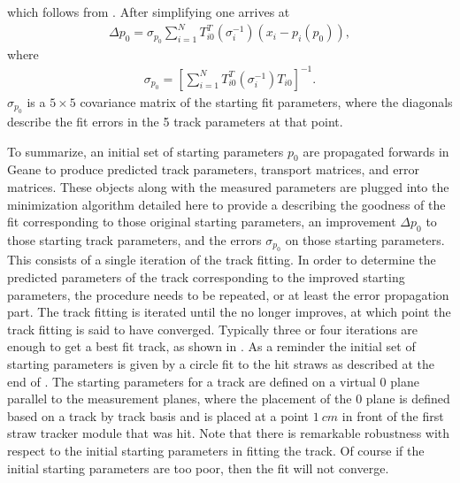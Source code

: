 which follows from . After simplifying one arrives at 
    \begin{align} \label{eq:deltap}
        \Delta p_{0} = \sigma_{p_{0}} \sum_{i=1}^{N} T^{T}_{i0}(\sigma_{i}^{-1})(x_{i} - p_{i}(p_{0})),
    \end{align}
where
    \begin{align} \label{eq:cov}
        \sigma_{p_{0}} = [\sum_{i=1}^{N} T^{T}_{i0} (\sigma_{i}^{-1}) T_{i0} ]^{-1}.
    \end{align}
$\sigma_{p_{0}}$ is a $5 \times 5$ covariance matrix of the starting fit parameters, where the diagonals describe the fit errors in the 5 track parameters at that point. 

To summarize, an initial set of starting parameters $p_{0}$ are propagated forwards in Geane to produce predicted track parameters, transport matrices, and error matrices. These objects along with the measured parameters are plugged into the \chisq minimization algorithm detailed here to provide a \chisq describing the goodness of the fit corresponding to those original starting parameters, an improvement $\Delta p_{0}$ to those starting track parameters, and the errors $\sigma_{p_{0}}$ on those starting parameters. This consists of a single iteration of the track fitting. In order to determine the predicted parameters of the track corresponding to the improved starting parameters, the procedure needs to be repeated, or at least the error propagation part. The track fitting is iterated until the \chisq no longer improves, at which point the track fitting is said to have converged. Typically three or four iterations are enough to get a best fit track, as shown in . As a reminder the initial set of starting parameters is given by a circle fit to the hit straws as described at the end of . The starting parameters for a track are defined on a virtual $0$ plane parallel to the measurement planes, where the placement of the $0$ plane is defined based on a track by track basis and is placed at a point $\SI{1}{cm}$ in front of the first straw tracker module that was hit. Note that there is remarkable robustness with respect to the initial starting parameters in fitting the track. Of course if the initial starting parameters are too poor, then the fit will not converge. 


